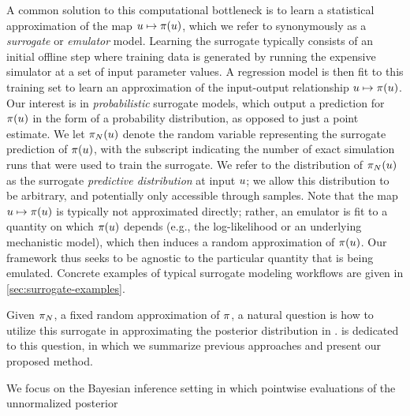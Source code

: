 \documentclass[12pt]{article}
\begin{document}
A common solution to this computational bottleneck is to learn a statistical approximation of the map 
$\Par \mapsto \postDens(\Par)$, which we refer to synonymously as a \textit{surrogate} or \textit{emulator}
model. Learning the surrogate typically consists of an initial offline step where training data 
is generated by running the expensive simulator at a set of input parameter values. A regression model 
is then fit to this training set to learn an approximation of the input-output relationship 
$\Par \mapsto \postDens(\Par)$. Our interest is in \textit{probabilistic} surrogate models, which output
a prediction for $\postDens(\Par)$ in the form of a probability distribution, as opposed to just a point estimate.
We let $\postEm[\Ndesign](\Par)$ denote the random variable representing the surrogate prediction 
of $\postDens(\Par)$, with the subscript indicating the number of exact simulation runs that were used 
to train the surrogate. We refer to the distribution of $\postEm[\Ndesign](\Par)$ as the surrogate 
\textit{predictive distribution} at input $\Par$; we allow this distribution to be arbitrary, and potentially 
only accessible through samples. Note that the map $\Par \mapsto \postDens(\Par)$ is typically not 
approximated directly; rather, an emulator is fit to a quantity on which $\postDens(\Par)$ depends 
(e.g., the log-likelihood or an underlying mechanistic model), which then induces a random approximation 
of $\postDens(\Par)$. Our framework thus seeks to be agnostic to the particular quantity that is 
being emulated. Concrete examples of typical surrogate modeling workflows are given in \cref{sec:surrogate-examples}.

Given $\postEm[\Ndesign]$, a fixed random approximation of $\postDens$, a natural question is how to 
utilize this surrogate in approximating the posterior distribution in . 
is dedicated to this question, in which we summarize previous approaches and present our proposed method.




We focus on the Bayesian inference setting in which pointwise evaluations of the unnormalized posterior
\end{document}
